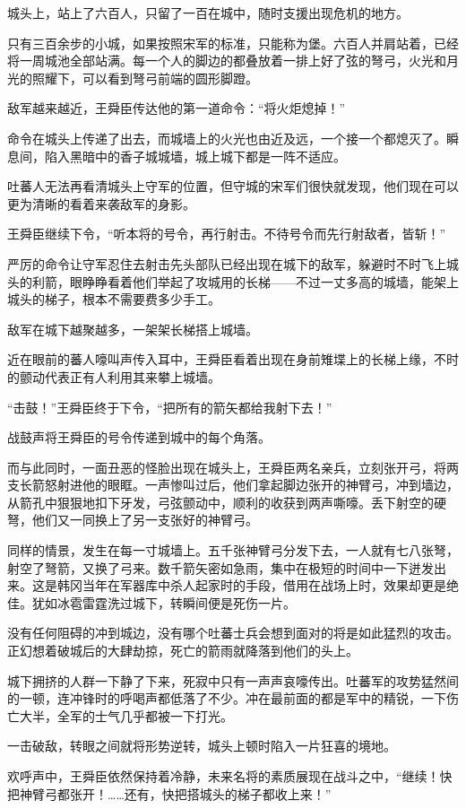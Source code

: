 城头上，站上了六百人，只留了一百在城中，随时支援出现危机的地方。

只有三百余步的小城，如果按照宋军的标准，只能称为堡。六百人并肩站着，已经将一周城池全部站满。每一个人的脚边的都叠放着一排上好了弦的弩弓，火光和月光的照耀下，可以看到弩弓前端的圆形脚蹬。

敌军越来越近，王舜臣传达他的第一道命令：“将火炬熄掉！”

命令在城头上传递了出去，而城墙上的火光也由近及远，一个接一个都熄灭了。瞬息间，陷入黑暗中的香子城城墙，城上城下都是一阵不适应。

吐蕃人无法再看清城头上守军的位置，但守城的宋军们很快就发现，他们现在可以更为清晰的看着来袭敌军的身影。

王舜臣继续下令，“听本将的号令，再行射击。不待号令而先行射敌者，皆斩！”

严厉的命令让守军忍住去射击先头部队已经出现在城下的敌军，躲避时不时飞上城头的利箭，眼睁睁看着他们举起了攻城用的长梯——不过一丈多高的城墙，能架上城头的梯子，根本不需要费多少手工。

敌军在城下越聚越多，一架架长梯搭上城墙。

近在眼前的蕃人嚎叫声传入耳中，王舜臣看着出现在身前雉堞上的长梯上缘，不时的颤动代表正有人利用其来攀上城墙。

“击鼓！”王舜臣终于下令，“把所有的箭矢都给我射下去！”

战鼓声将王舜臣的号令传递到城中的每个角落。

而与此同时，一面丑恶的怪脸出现在城头上，王舜臣两名亲兵，立刻张开弓，将两支长箭怒射进他的眼眶。一声惨叫过后，他们拿起脚边张开的神臂弓，冲到墙边，从箭孔中狠狠地扣下牙发，弓弦颤动中，顺利的收获到两声嘶嚎。丢下射空的硬弩，他们又一同换上了另一支张好的神臂弓。

同样的情景，发生在每一寸城墙上。五千张神臂弓分发下去，一人就有七八张弩，射空了弩箭，又换了弓来。数千箭矢密如急雨，集中在极短的时间中一下迸发出来。这是韩冈当年在军器库中杀人起家时的手段，借用在战场上时，效果却更是绝佳。犹如冰雹雷霆洗过城下，转瞬间便是死伤一片。

没有任何阻碍的冲到城边，没有哪个吐蕃士兵会想到面对的将是如此猛烈的攻击。正幻想着破城后的大肆劫掠，死亡的箭雨就降落到他们的头上。

城下拥挤的人群一下静了下来，死寂中只有一声声哀嚎传出。吐蕃军的攻势猛然间的一顿，连冲锋时的呼喝声都低落了不少。冲在最前面的都是军中的精锐，一下伤亡大半，全军的士气几乎都被一下打光。

一击破敌，转眼之间就将形势逆转，城头上顿时陷入一片狂喜的境地。

欢呼声中，王舜臣依然保持着冷静，未来名将的素质展现在战斗之中，“继续！快把神臂弓都张开！……还有，快把搭城头的梯子都收上来！”

